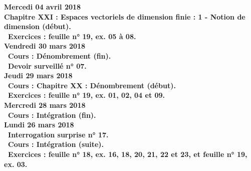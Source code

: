 \documentclass[12pt,a4paper]{article}
\begin{document}
% 
% 
% 

\noindent\textbf{Mercedi 04 avril 2018}\\
\bf Chapitre XXI \rm : Espaces vectoriels de dimension finie  : 1 - Notion de dimension (début).\\
\bu\ Exercices : feuille n° 19, ex. 05 à 08.\vspace{.4cm}\\

\noindent\textbf{Vendredi 30 mars 2018}\\
\bu\ Cours : Dénombrement (fin).\\
\bu\ Devoir surveillé n° 07.\vspace{.4cm}\\

\noindent\textbf{Jeudi 29 mars 2018}\\
\bu\ Cours : \bf Chapitre XX \rm : Dénombrement (début).\\
\bu\ Exercices : feuille n° 19, ex. 01, 02, 04 et 09.\vspace{.4cm}\\

\noindent\textbf{Mercredi 28 mars 2018} \\
\bu\ Cours : Intégration (fin).\vspace{.4cm}\\

\noindent\textbf{\bf Lundi 26 mars 2018} \\
\bu\ Interrogation surprise n° 17.\\
\bu\ Cours : Intégration (suite).\\
\bu\ Exercices : feuille n° 18, ex. 16, 18, 20, 21, 22 et 23, et feuille n° 19, ex. 03.\vspace{.4cm}\\
\end{document}
